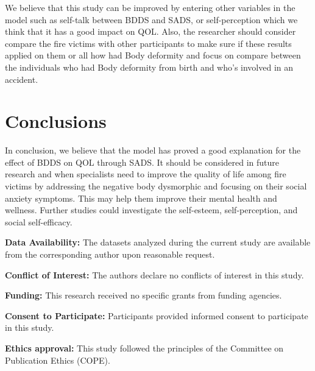 \documentclass{NSP1}
\begin{document}
We believe that this study can be improved by entering other variables in the model such as self-talk between BDDS and SADS, or self-perception which we think that it has a good impact on QOL. Also, the researcher should consider compare the fire victims with other participants to make sure if these results applied on them or all how had Body deformity and focus on compare between the individuals who had Body deformity from birth and who's involved in an accident.

\section{Conclusions}
In conclusion, we believe that the model has proved a good explanation for the effect of BDDS on QOL through SADS. It should be considered in future research and when specialists need to improve the quality of life among fire victims by addressing the negative body dysmorphic and focusing on their social anxiety symptoms. This may help them improve their mental health and wellness. Further studies could investigate the self-esteem, self-perception, and social self-efficacy.

\vspace{2mm}
\noindent\textbf{Data Availability:} The datasets analyzed during the current study are available from the corresponding author upon reasonable request.

\vspace{1mm}
\noindent\textbf{Conflict of Interest:} The authors declare no conflicts of interest in this study.

\vspace{1mm}
\noindent\textbf{Funding:} This research received no specific grants from funding agencies.

\vspace{1mm}
\noindent\textbf{Consent to Participate:} Participants provided informed consent to participate in this study.

\vspace{1mm}
\noindent\textbf{Ethics approval:} This study followed the principles of the Committee on Publication Ethics (COPE).
\end{document}
